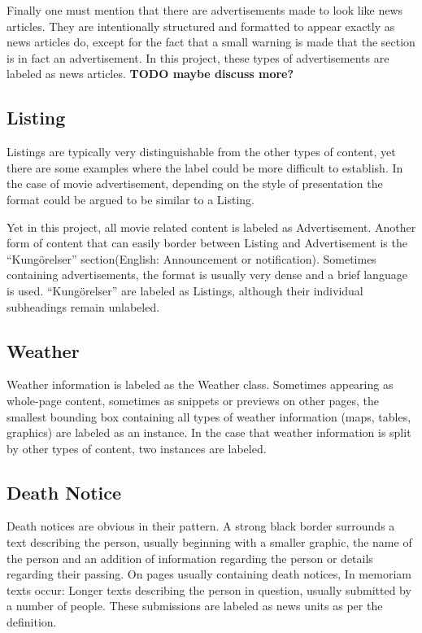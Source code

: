 \documentclass[english, bibtex]{kththesis}
\begin{document}
Finally one must mention that there are advertisements made to look like news articles. They are intentionally structured and formatted to appear exactly as news articles do, except for the fact that a small warning is made that the section is in fact an advertisement. In this project, these types of advertisements are labeled as news articles. \textbf{TODO maybe discuss more?}

\subsection{Listing}

Listings are typically very distinguishable from the other types of content, yet there are some examples where the label could be more difficult to establish. In the case of movie advertisement, depending on the style of presentation the format could be argued to be similar to a Listing.

Yet in this project, all movie related content is labeled as Advertisement. Another form of content that can easily border between Listing and Advertisement is the “Kungörelser” section(English: Announcement or notification). Sometimes containing advertisements, the format is usually very dense and a brief language is used. “Kungörelser” are labeled as Listings, although their individual subheadings remain unlabeled.

\subsection{Weather}

Weather information is labeled as the Weather class. Sometimes appearing as whole-page content, sometimes as snippets or previews on other pages, the smallest bounding box containing all types of weather information (maps, tables, graphics) are labeled as an instance. In the case that weather information is split by other types of content, two instances are labeled.

\subsection{Death Notice}

Death notices are obvious in their pattern. A strong black border surrounds a text describing the person, usually beginning with a smaller graphic, the name of the person and an addition of information regarding the person or details regarding their passing. On pages usually containing death notices, In memoriam texts occur: Longer texts describing the person in question, usually submitted by a number of people. These submissions are labeled as news units as per the definition. 
\end{document}
